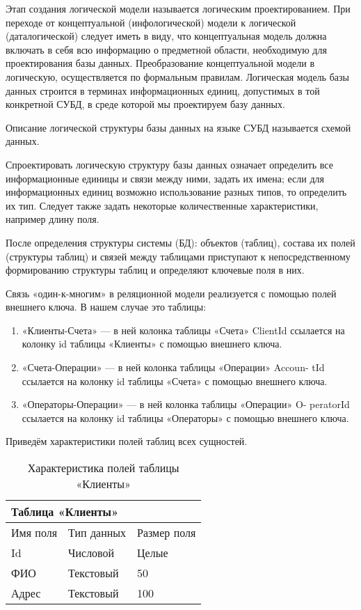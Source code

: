 \documentclass[14pt]{extarticle}
\begin{document}
    Этап создания логической модели называется логическим проектированием. При переходе от концептуальной (инфологической) модели к логической (даталогической) следует иметь в виду, что концептуальная модель должна включать в себя всю информацию о предметной области, необходимую для проектирования базы данных. Преобразование концептуальной модели в логическую, осуществляется по формальным правилам. Логическая модель базы данных строится в терминах информационных единиц, допустимых в той конкретной СУБД, в среде которой мы проектируем базу данных.

    Описание логической структуры базы данных на языке СУБД называется схемой данных.

    Спроектировать логическую структуру базы данных означает определить все информационные единицы и связи между ними, задать их имена; если для информационных единиц возможно использование разных типов, то определить их тип. Следует также задать некоторые количественные характеристики, например длину поля.

    После определения структуры системы (БД): объектов (таблиц), состава их полей (структуры таблиц) и связей между таблицами приступают к непосредственному формированию структуры таблиц и определяют ключевые поля в них.

    Связь «один-к-многим» в реляционной модели реализуется с помощью полей внешнего ключа. В нашем случае это таблицы:
    \begin{enumerate}
        \item «Клиенты-Счета» --- в ней колонка таблицы «Счета» ClientId ссылается на колонку id таблицы «Клиенты» с помощью внешнего ключа.
        \item «Счета-Операции» --- в ней колонка таблицы «Операции» Accoun- tId ссылается на колонку id таблицы «Счета» с помощью внешнего ключа.
        \item «Операторы-Операции» --- в ней колонка таблицы «Операции» O- peratorId ссылается на колонку id таблицы «Операторы» с помощью внешнего ключа.
    \end{enumerate}

    Приведём характеристики полей таблиц всех сущностей.

    \begin{table}[!ht]
        \centering
        \begin{tabular}{|l|l|l|}
            \hline
            \multicolumn{3}{|l|}{Таблица «Клиенты»} \\
            \hline
            Имя поля & Тип данных & Размер поля \\
            \hline
            Id & Числовой & Целые \\
            ФИО & Текстовый & 50 \\
            Адрес & Текстовый & 100 \\
            \hline
        \end{tabular}
        \caption{Характеристика полей таблицы «Клиенты»}
    \end{table}
\end{document}
